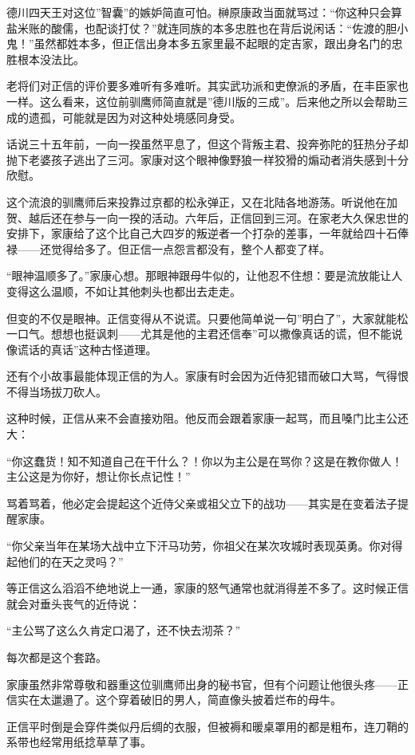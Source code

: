 \documentclass[
]{book}
\begin{document}
德川四天王对这位''智囊''的嫉妒简直可怕。榊原康政当面就骂过：``你这种只会算盐米账的酸儒，也配谈打仗？''就连同族的本多忠胜也在背后说闲话：``佐渡的胆小鬼！''虽然都姓本多，但正信出身本多五家里最不起眼的定吉家，跟出身名门的忠胜根本没法比。

老将们对正信的评价要多难听有多难听。其实武功派和吏僚派的矛盾，在丰臣家也一样。这么看来，这位前驯鹰师简直就是''德川版的三成''。后来他之所以会帮助三成的遗孤，可能就是因为对这种处境感同身受。

话说三十五年前，一向一揆虽然平息了，但这个背叛主君、投奔弥陀的狂热分子却抛下老婆孩子逃出了三河。家康对这个眼神像野狼一样狡猾的煽动者消失感到十分欣慰。

这个流浪的驯鹰师后来投靠过京都的松永弹正，又在北陆各地游荡。听说他在加贺、越后还在参与一向一揆的活动。六年后，正信回到三河。在家老大久保忠世的安排下，家康给了这个比自己大四岁的叛逆者一个打杂的差事，一年就给四十石俸禄------还觉得给多了。但正信一点怨言都没有，整个人都变了样。

``眼神温顺多了。''家康心想。那眼神跟母牛似的，让他忍不住想：要是流放能让人变得这么温顺，不如让其他刺头也都出去走走。

但变的不仅是眼神。正信变得从不说谎。只要他简单说一句''明白了''，大家就能松一口气。想想也挺讽刺------尤其是他的主君还信奉''可以撒像真话的谎，但不能说像谎话的真话''这种古怪道理。

还有个小故事最能体现正信的为人。家康有时会因为近侍犯错而破口大骂，气得恨不得当场拔刀砍人。

这种时候，正信从来不会直接劝阻。他反而会跟着家康一起骂，而且嗓门比主公还大：

``你这蠢货！知不知道自己在干什么？！你以为主公是在骂你？这是在教你做人！主公这是为你好，想让你长点记性！''

骂着骂着，他必定会提起这个近侍父亲或祖父立下的战功------其实是在变着法子提醒家康。

``你父亲当年在某场大战中立下汗马功劳，你祖父在某次攻城时表现英勇。你对得起他们的在天之灵吗？''

等正信这么滔滔不绝地说上一通，家康的怒气通常也就消得差不多了。这时候正信就会对垂头丧气的近侍说：

``主公骂了这么久肯定口渴了，还不快去沏茶？''

每次都是这个套路。

家康虽然非常尊敬和器重这位驯鹰师出身的秘书官，但有个问题让他很头疼------正信实在太邋遢了。这个穿着破旧的男人，简直像头披着烂布的母牛。

正信平时倒是会穿件类似丹后绸的衣服，但被褥和暖桌罩用的都是粗布，连刀鞘的系带也经常用纸捻草草了事。
\end{document}
